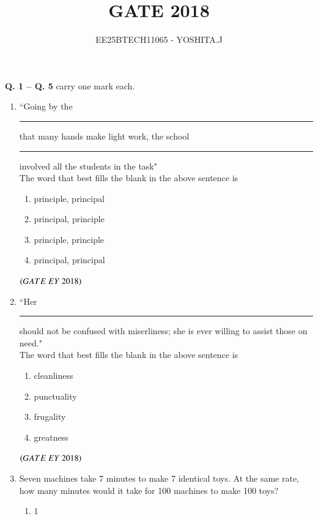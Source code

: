 \documentclass[journal]{IEEEtran}
\numberwithin{equation}{enumi}
\numberwithin{figure}{enumi}
\begin{document}

\vspace{3cm}

\title{GATE 2018}
\author{EE25BTECH11065 - YOSHITA.J}
\maketitle

\noindent \textbf{Q. 1 -- Q. \textbf{5}} carry one mark each.

\begin{enumerate}
    \item ``Going by the\rule{3cm}{0.15mm} that many hands make light work, the school\rule{3cm}{0.15mm} involved all the students in the task"\\The word that best fills the blank in the above sentence is
    \begin{multicols}{2}
    \begin{enumerate}
        \item  principle, principal
        \item  principal, principle\\
        \item  principle, principle
        \item  principal, principal
    \end{enumerate}
    \end{multicols}
    \hfill{$\brak{ GATE\ EY\ 2018}$}
    \bigskip
    \item ``Her\rule{3cm}{0.15mm} should not be confused with miserliness; she is ever willing to assist those on need."\\The word that best fills the blank in the above sentence is
\begin{multicols}{4}
\begin{enumerate}
    \item cleanliness
    \item punctuality
    \item frugality
    \item greatness
\end{enumerate}
\end{multicols}
\hfill{$\brak{ GATE\ EY\ 2018}$}
\bigskip
\item Seven machines take 7 minutes to make 7 identical toys. At the same rate, how many minutes would it take for 100 machines to make 100 toys?
\begin{multicols}{4}
\begin{enumerate}
    \item $1$

\end{enumerate}
\end{multicols}
\end{enumerate}
\end{document}
